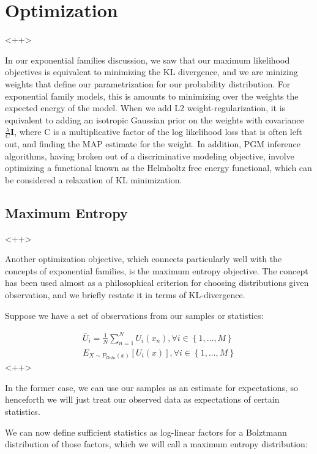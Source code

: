 \documentclass[a4paper]{article}
\begin{document}
\section{Optimization}<++>

In our exponential families discussion, we saw that our maximum likelihood objectives is equivalent to minimizing the KL divergence, and we are minizing weights that define our parametrization for our probability distribution.
For exponential family models, this is amounts to minimizing over the weights the expected energy of the model. 
When we add L2 weight-regularization, it is equivalent to adding an isotropic Gaussian prior on the weights with covariance $\frac{\lambda}{C} \mathbf{I}$, where C is a multiplicative factor of the log likelihood loss that is often left out, and finding the MAP estimate for the weight. 
In addition, PGM inference algorithms, having broken out of a discriminative modeling objective, involve optimizing a functional known as the Helmholtz free energy functional, which can be considered a relaxation of KL minimization.

\subsection{Maximum Entropy}<++>

Another optimization objective, which connects particularly well with the concepts of exponential families, is the maximum entropy objective. 
The concept has been used almost as a philosophical criterion for choosing distributions given observation, and we briefly restate it in terms of KL-divergence.

Suppose we have a set of observations from our samples or statistics:

\begin{equation}
  \begin{split}
    \bar{U}_i = \frac{1}{N} \sum_{n=1}^N U_i(x_n), \forall i \in \left\{ 1,\ldots,M \right\} \\
    E_{ X \sim P_{Data}(x)} \left[ U_i(x) \right], \forall i \in \left\{ 1, \ldots, M \right\}
  \end{split}
  \label{<++>}
\end{equation}<++>

In the former case, we can use our samples as an estimate for expectations, so henceforth we will just treat our observed data as expectations of certain statistics. 

We can now define sufficient statistics as log-linear factors for a Bolztmann distribution of those factors, which we will call a maximum entropy distribution:
\end{document}
